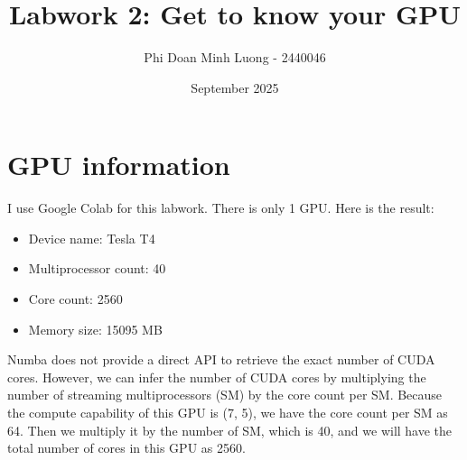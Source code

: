 \documentclass{article}
\title{Labwork 2: Get to know your GPU}
\author{Phi Doan Minh Luong - 2440046}
\date{September 2025}
\begin{document}
\maketitle

\setlength\parindent{0pt}

\section{GPU information}
I use Google Colab for this labwork. There is only 1 GPU. Here is the result:
\begin{itemize}
    \item Device name: Tesla T4
    \item Multiprocessor count: 40
    \item Core count: 2560
    \item Memory size: 15095 MB
\end{itemize}
Numba does not provide a direct API to retrieve the exact number of CUDA cores. However, we can infer the number of CUDA cores by multiplying the number of streaming multiprocessors (SM) by the core count per SM. Because the compute capability of this GPU is (7, 5), we have the core count per SM as 64. Then we multiply it by the number of SM, which is 40, and we will have the total number of cores in this GPU as 2560.
\end{document}
